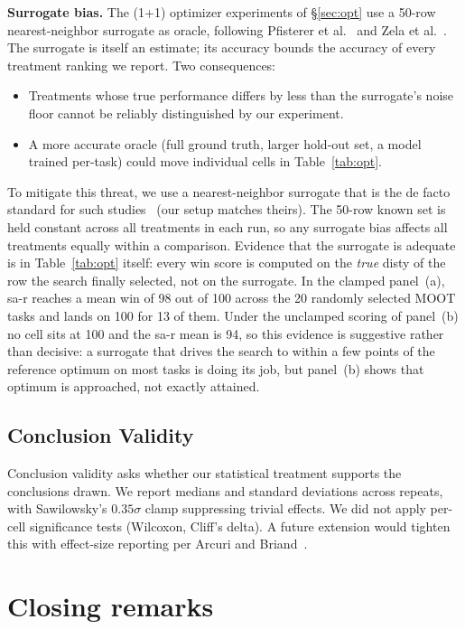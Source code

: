\documentclass[AMA,STIX2COL]{WileyNJDv5}
\newcommand{\NEW}[1]{\textcolor{newblue}{#1}}
\begin{document}
\textbf{Surrogate bias.} The (1+1) optimizer experiments of
\S\ref{sec:opt} use a 50-row nearest-neighbor surrogate as
oracle, following Pfisterer et
al.~\cite{pfisterer2022yahpo} and Zela et
al.~\cite{zela2020surrogate}. The surrogate is itself an
estimate; its accuracy bounds the accuracy of every
treatment ranking we report. Two consequences:
\begin{itemize}
\item Treatments whose true performance differs by less
than the surrogate's noise floor cannot be reliably
distinguished by our experiment.
\item A more accurate oracle (full ground truth, larger
hold-out set, a model trained per-task) could move
individual cells in Table~\ref{tab:opt}.
\end{itemize}
To mitigate this threat, we use a nearest-neighbor surrogate
that is the de facto standard for such
studies~\cite{pfisterer2022yahpo, zela2020surrogate} (our
setup matches theirs). The 50-row known set is held constant
across all treatments in each run, so any surrogate bias
affects all treatments equally within a comparison.
\NEW{Evidence that the surrogate is adequate is in
Table~\ref{tab:opt} itself: every \textsf{win} score is
computed on the {\em true} \textsf{disty} of the row the
search finally selected, not on the surrogate. In the clamped
panel~(a), \textsf{sa-r} reaches a mean win of 98 out of 100
across the 20 randomly selected MOOT tasks and lands on 100 for
13 of them. Under the unclamped scoring of panel~(b) no cell
sits at 100 and the \textsf{sa-r} mean is 94, so this evidence
is suggestive rather than decisive: a surrogate that drives the
search to within a few points of the reference optimum on most
tasks is doing its job, but panel~(b) shows that optimum is
approached, not exactly attained.} 
\subsection{Conclusion Validity}
Conclusion validity asks whether our statistical treatment
supports the conclusions drawn. We report medians and
standard deviations across repeats, with Sawilowsky's
$0.35\sigma$ clamp suppressing trivial effects. We did not
apply per-cell significance tests (Wilcoxon, Cliff's delta).
A future extension would tighten this with effect-size
reporting per Arcuri and
Briand~\cite{arcuri2011practical}.

\section{Closing remarks}\label{sec:disc}
\end{document}
